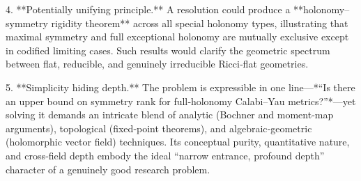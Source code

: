 4. **Potentially unifying principle.**  
   A resolution could produce a **holonomy–symmetry rigidity theorem** across all special holonomy types, illustrating that maximal symmetry and full exceptional holonomy are mutually exclusive except in codified limiting cases. Such results would clarify the geometric spectrum between flat, reducible, and genuinely irreducible Ricci‑flat geometries.

5. **Simplicity hiding depth.**  
   The problem is expressible in one line—*“Is there an upper bound on symmetry rank for full‑holonomy Calabi–Yau metrics?”*—yet solving it demands an intricate blend of analytic (Bochner and moment‑map arguments), topological (fixed‑point theorems), and algebraic‑geometric (holomorphic vector field) techniques.  
   Its conceptual purity, quantitative nature, and cross‑field depth embody the ideal “narrow entrance, profound depth” character of a genuinely good research problem.